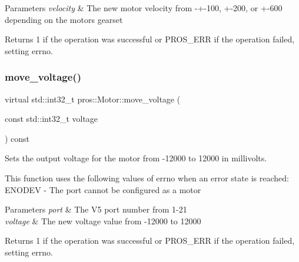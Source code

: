 \begin{DoxyParams}{Parameters}
{\em velocity} & The new motor velocity from -\/+-\/100, +-\/200, or +-\/600 depending on the motor\textquotesingle{}s gearset\\
\hline
\end{DoxyParams}
\begin{DoxyReturn}{Returns}
1 if the operation was successful or P\+R\+O\+S\+\_\+\+E\+RR if the operation failed, setting errno. 
\end{DoxyReturn}
\mbox{\label{classpros_1_1Motor_a3c79db57c20617fbbc49461c58612cfb}} 
\subsubsection{\texorpdfstring{move\+\_\+voltage()}{move\_voltage()}}
{\footnotesize\ttfamily virtual std\+::int32\+\_\+t pros\+::\+Motor\+::move\+\_\+voltage (\begin{DoxyParamCaption}\item[{const std\+::int32\+\_\+t}]{voltage }\end{DoxyParamCaption}) const\hspace{0.3cm}{\ttfamily [virtual]}}

Sets the output voltage for the motor from -\/12000 to 12000 in millivolts.

This function uses the following values of errno when an error state is reached\+: E\+N\+O\+D\+EV -\/ The port cannot be configured as a motor


\begin{DoxyParams}{Parameters}
{\em port} & The V5 port number from 1-\/21 \\
\hline
{\em voltage} & The new voltage value from -\/12000 to 12000\\
\hline
\end{DoxyParams}
\begin{DoxyReturn}{Returns}
1 if the operation was successful or P\+R\+O\+S\+\_\+\+E\+RR if the operation failed, setting errno. 
\end{DoxyReturn}
\mbox{\label{classpros_1_1Motor_a4cf8a9518eb6cd268d27151f0df7fd38}} 
